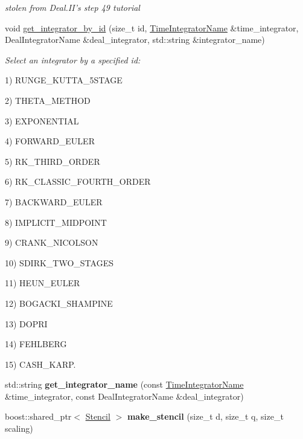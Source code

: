 \begin{DoxyCompactItemize}
\begin{DoxyCompactList}\small\item\em stolen from Deal.II's step 49 tutorial \item\end{DoxyCompactList}\item 
void \hyperlink{namespacenatrium_1_1CFDSolverUtilities_a3719826384e1c13644bac00524f72a46}{get\_\-integrator\_\-by\_\-id} (size\_\-t id, \hyperlink{namespacenatrium_a00a0ec1e80f138680e0fcca78349f6d8}{TimeIntegratorName} \&time\_\-integrator, DealIntegratorName \&deal\_\-integrator, std::string \&integrator\_\-name)
\begin{DoxyCompactList}\small\item\em Select an integrator by a specified id:
\begin{DoxyItemize}
\item 1) RUNGE\_\-KUTTA\_\-5STAGE
\item 2) THETA\_\-METHOD
\item 3) EXPONENTIAL
\item 4) FORWARD\_\-EULER
\item 5) RK\_\-THIRD\_\-ORDER
\item 6) RK\_\-CLASSIC\_\-FOURTH\_\-ORDER
\item 7) BACKWARD\_\-EULER
\item 8) IMPLICIT\_\-MIDPOINT
\item 9) CRANK\_\-NICOLSON
\item 10) SDIRK\_\-TWO\_\-STAGES
\item 11) HEUN\_\-EULER
\item 12) BOGACKI\_\-SHAMPINE
\item 13) DOPRI
\item 14) FEHLBERG
\item 15) CASH\_\-KARP. 
\end{DoxyItemize}\item\end{DoxyCompactList}\item 
\hypertarget{namespacenatrium_1_1CFDSolverUtilities_adef7eb36e19b4d7a1e785aac88932099}{
std::string {\bfseries get\_\-integrator\_\-name} (const \hyperlink{namespacenatrium_a00a0ec1e80f138680e0fcca78349f6d8}{TimeIntegratorName} \&time\_\-integrator, const DealIntegratorName \&deal\_\-integrator)}
\label{namespacenatrium_1_1CFDSolverUtilities_adef7eb36e19b4d7a1e785aac88932099}

\item 
\hypertarget{namespacenatrium_1_1CFDSolverUtilities_a6bbf2001ab29fe02fc3a11bcf1515614}{
boost::shared\_\-ptr$<$ \hyperlink{classnatrium_1_1Stencil}{Stencil} $>$ {\bfseries make\_\-stencil} (size\_\-t d, size\_\-t q, size\_\-t scaling)}
\label{namespacenatrium_1_1CFDSolverUtilities_a6bbf2001ab29fe02fc3a11bcf1515614}


\end{DoxyCompactItemize}
